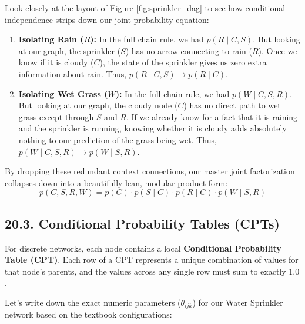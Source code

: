 \documentclass{article}
\begin{document}
Look closely at the layout of Figure \ref{fig:sprinkler_dag} to see how conditional independence strips down our joint probability equation:
\begin{enumerate}
    \item \textbf{Isolating Rain ($R$):} In the full chain rule, we had $p(R \mid C, S)$. But looking at our graph, the sprinkler ($S$) has no arrow connecting to rain ($R$). Once we know if it is cloudy ($C$), the state of the sprinkler gives us zero extra information about rain. Thus, $p(R \mid C, S) \to p(R \mid C)$.
    \item \textbf{Isolating Wet Grass ($W$):} In the full chain rule, we had $p(W \mid C, S, R)$. But looking at our graph, the cloudy node ($C$) has no direct path to wet grass except through $S$ and $R$. If we already know for a fact that it is raining and the sprinkler is running, knowing whether it is cloudy adds absolutely nothing to our prediction of the grass being wet. Thus, $p(W \mid C, S, R) \to p(W \mid S, R)$.
\end{enumerate}

By dropping these redundant context connections, our master joint factorization collapses down into a beautifully lean, modular product form:
\begin{equation}
p(C, S, R, W) = p(C) \cdot p(S \mid C) \cdot p(R \mid C) \cdot p(W \mid S, R) \tag{132}
\end{equation}

\subsection*{20.3. Conditional Probability Tables (CPTs)}
For discrete networks, each node contains a local \textbf{Conditional Probability Table (CPT)}. Each row of a CPT represents a unique combination of values for that node's parents, and the values across any single row must sum to exactly $1.0$.

Let's write down the exact numeric parameters ($\theta_{ijk}$) for our Water Sprinkler network based on the textbook configurations:
\end{document}
